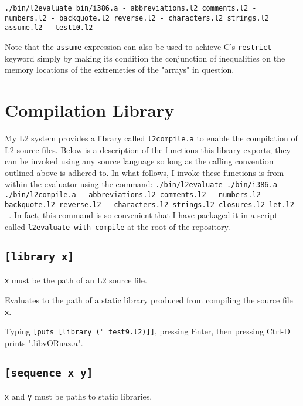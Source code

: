 \documentclass[twocolumn,landscape]{article}
\begin{document}
      \begin{lstlisting}[caption={shell}]
./bin/l2evaluate bin/i386.a - abbreviations.l2 comments.l2 - numbers.l2 - backquote.l2 reverse.l2 - characters.l2 strings.l2 assume.l2 - test10.l2
      \end{lstlisting}
      Note that the \lstinline{assume} expression can also be used to achieve C's \lstinline{restrict} keyword simply by making its condition the conjunction of inequalities on the memory locations of the extremeties of the "arrays" in question.

  \section{Compilation Library}\label{sec:compilation-library}
    My L2 system provides a library called \lstinline{l2compile.a} to enable the compilation of L2 source files. Below is a description of the functions this library exports; they can be invoked using any source language so long as \hyperref[sec:invoke]{the calling convention} outlined above is adhered to. In what follows, I invoke these functions is from within \hyperref[sec:the-evaluator]{the evaluator} using the command: \lstinline{./bin/l2evaluate ./bin/i386.a ./bin/l2compile.a - abbreviations.l2 comments.l2 - numbers.l2 - backquote.l2 reverse.l2 - characters.l2 strings.l2 closures.l2 let.l2 -}. In fact, this command is so convenient that I have packaged it in a script called \href{https://raw.githubusercontent.com/murisi/L2/master/l2evaluate-with-compile}{\lstinline{l2evaluate-with-compile}} at the root of the repository.

    \subsection{\lstinline{[library x]}}
      \lstinline{x} must be the path of an L2 source file.

      Evaluates to the path of a static library produced from compiling the source file \lstinline{x}.

      Typing \lstinline{[puts [library (" test9.l2)]]}, pressing Enter, then pressing Ctrl-D prints ".libvORuaz.a".

    \subsection{\lstinline{[sequence x y]}}
      \lstinline{x} and \lstinline{y} must be paths to static libraries.
\end{document}
